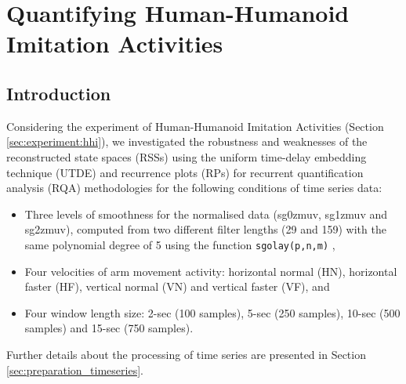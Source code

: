 
\chapter{Quantifying Human-Humanoid Imitation Activities} \label{chapter6}

\graphicspath{{figs/chapter6/PDF/}}

\section{Introduction} 
Considering the experiment of Human-Humanoid Imitation Activities
(Section \ref{sec:experiment:hhi}), 
we investigated the robustness and weaknesses of the reconstructed 
state spaces (RSSs) using the uniform time-delay embedding technique (UTDE) 
and recurrence plots (RPs) for recurrent quantification analysis (RQA) 
methodologies for the following conditions of time series data: 
\begin{itemize}

\item Three levels of smoothness for the normalised data 
(sg0zmuv, sg1zmuv and sg2zmuv), computed from two different filter 
lengths (29 and 159) with the same polynomial degree of 5 using the 
function \texttt{sgolay(p,n,m)} \citep{Rsignal},

\item Four velocities of arm movement activity: horizontal normal (HN), 
	horizontal faster (HF), vertical normal (VN) and 
	vertical faster (VF), and
\item Four window length size: 2-sec (100 samples), 5-sec (250 samples), 
	10-sec (500 samples) and 15-sec (750 samples).
\end{itemize}

Further details about the processing of time series are presented in
Section \ref{sec:preparation_timeseries}.

